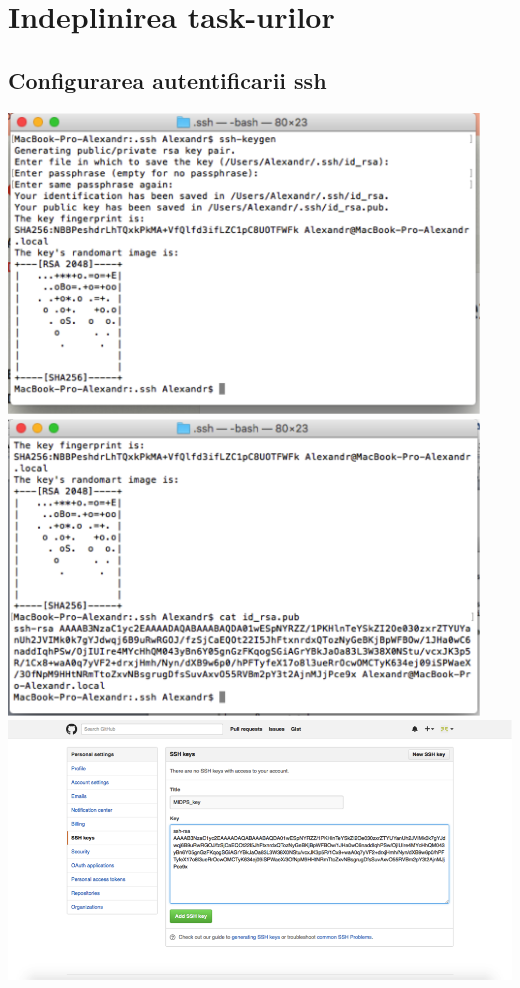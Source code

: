\documentclass[12pt]{article}
\begin{document}
\section{Indeplinirea task-urilor}
\subsection{Configurarea autentificarii ssh}
\includegraphics[width=12.5cm]{images/1}\\
\includegraphics[width=12.5cm]{images/2}\\
\includegraphics[width=15.5cm]{images/3}\\
\end{document}
